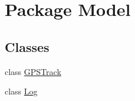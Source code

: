 \hypertarget{namespace_model}{}\section{Package Model}
\label{namespace_model}
\subsection*{Classes}
\begin{DoxyCompactItemize}
\item 
class \hyperlink{class_model_1_1_g_p_s_track}{G\+P\+S\+Track}
\item 
class \hyperlink{class_model_1_1_log}{Log}
\end{DoxyCompactItemize}
